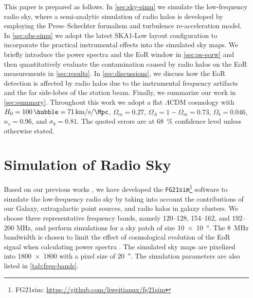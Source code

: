 \documentclass[twocolumn]{aastex62}
\newcommand{\lcdm}{$\Lambda$CDM}
\newcommand{\editone}[1]{{\leavevmode\color{cyan}#1}}
\begin{document}
This paper is prepared as follows.
In \autoref{sec:sky-simu} we simulate the low-frequency radio sky, where a
\editone{semi-analytic} simulation of radio halos is developed by employing
the Press--Schechter formalism and turbulence re-acceleration model.
In \autoref{sec:obs-simu} we adopt the latest SKA1-Low layout
configuration to incorporate the practical instrumental effects into
the simulated sky maps.
We briefly introduce the power spectra and the EoR window in
\autoref{sec:ps-eorw}
and then quantitatively evaluate the contamination caused by radio halos
on the EoR measurements in \autoref{sec:results}.
In \autoref{sec:discussions}, we discuss how the EoR detection is
affected by radio halos due to the instrumental frequency artifacts
and the far side-lobes of the station beam.
Finally, we summarize our work in \autoref{sec:summary}.
Throughout this work we adopt a flat \lcdm{} cosmology with
$H_0 = \SI{100}{\hubble} = \SI{71}{\km\per\second\per\Mpc}$,
$\Omega_m = 0.27$, $\Omega_{\Lambda} = 1 - \Omega_m = 0.73$,
$\Omega_b = 0.046$, $n_s = 0.96$, and $\sigma_8 = 0.81$.
The quoted errors are at \SI{68}{\percent} confidence level unless
otherwise stated.


\section{Simulation of Radio Sky}
\label{sec:sky-simu}

Based on our previous works \citep{wang2010,wang2013}, we have developed
the \texttt{FG21sim}\footnote{%
  FG21sim: \url{https://github.com/liweitianux/fg21sim}}
software to simulate the low-frequency
radio sky by taking into account the contributions of our Galaxy,
extragalactic point sources, and radio halos in galaxy clusters.
We choose three representative frequency bands, namely
\numrange{120}{128}, \numrange{154}{162}, and \numrange{192}{200}
\si{\MHz}, and perform simulations for a sky patch of size
\SI[product-units=repeat]{10 x 10}{\degree}.
The \SI{8}{\MHz} bandwidth is chosen to limit the effect of
cosmological evolution of the EoR signal when calculating power
spectra \citep[e.g.][]{wyithe2004,thyagarajan2013}.
The simulated sky maps are pixelized into \num{1800 x 1800} with a pixel
size of \SI{20}{\arcsecond}.
The simulation parameters are also listed in \autoref{tab:freq-bands}.
\end{document}

